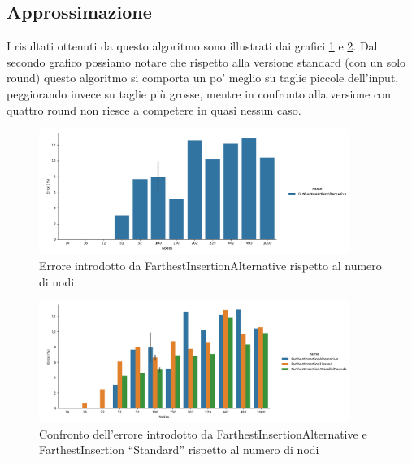 \subsection{Approssimazione}

I risultati ottenuti da questo algoritmo sono illustrati dai grafici
\ref{fig:farthest-insertion-alt-accuracy-error} e
\ref{fig:farthest-insertion-alt-vs-std-1-4-rounds-accuracy-error}.
Dal secondo grafico possiamo notare che rispetto alla versione
standard (con un solo round) questo algoritmo si comporta un po'
meglio su taglie piccole dell'input, peggiorando invece su taglie più
grosse, mentre in confronto alla versione con quattro round non riesce
a competere in quasi nessun caso.

\begin{figure}[!ht]
    \centering

    \includegraphics[width=0.9\textwidth]{./images/FarthestInsertionAlternative__approximation_error_.png}

    \caption{Errore introdotto da FarthestInsertionAlternative rispetto al numero di nodi}
    \label{fig:farthest-insertion-alt-accuracy-error}
\end{figure}

\begin{figure}[!ht]
    \centering

    \includegraphics[width=0.9\textwidth]{./images/FarthestInsertionAlternative_vs_FarthestInsertion1Round_vs_FarthestInsertion4ParallelRounds__approximation_error_.png}

    \caption{Confronto dell'errore introdotto da FarthestInsertionAlternative e FarthestInsertion ``Standard'' rispetto al numero di nodi}
    \label{fig:farthest-insertion-alt-vs-std-1-4-rounds-accuracy-error}
\end{figure}

